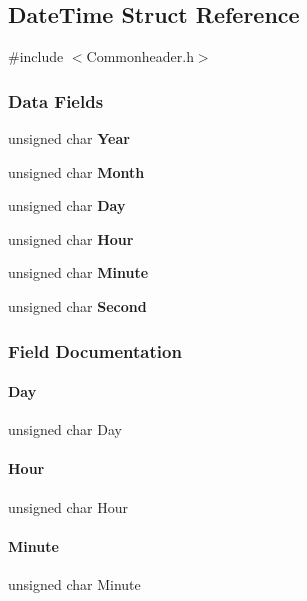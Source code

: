 \subsection{Date\+Time Struct Reference}
\label{a00068}


{\ttfamily \#include $<$Commonheader.\+h$>$}

\subsubsection*{Data Fields}
\begin{DoxyCompactItemize}
\item 
unsigned char \textbf{ Year}
\item 
unsigned char \textbf{ Month}
\item 
unsigned char \textbf{ Day}
\item 
unsigned char \textbf{ Hour}
\item 
unsigned char \textbf{ Minute}
\item 
unsigned char \textbf{ Second}
\end{DoxyCompactItemize}


\subsubsection{Field Documentation}
\mbox{\label{a00068_af7f79d94bfdb7a238a4ccb25de73ca8a}} 
\paragraph{Day}
{\footnotesize\ttfamily unsigned char Day}

\mbox{\label{a00068_a59fec9c399e7dcb45a05c1b3ac680b20}} 
\paragraph{Hour}
{\footnotesize\ttfamily unsigned char Hour}

\mbox{\label{a00068_acc695bffa10a2b9dac7fe6ec0e3750b9}} 
\paragraph{Minute}
{\footnotesize\ttfamily unsigned char Minute}

